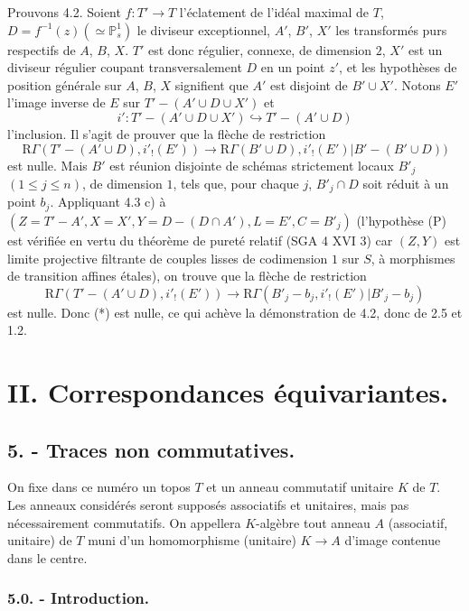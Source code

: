 Prouvons 4.2. Soient $f:T'\to T$ l'éclatement de l'idéal
maximal de $T$, $D=f^{-1}(z)(\simeq\mathbb{P}^1_s)$ le diviseur exceptionnel, $A'$, $B'$, $X'$ les transformés purs respectifs de $A$, $B$, $X$. $T'$ est donc régulier, connexe, de dimension $2$, $X'$ est un diviseur régulier coupant transversalement $D$ en un point $z'$, et les hypothèses de position générale sur $A$, $B$, $X$ signifient que $A'$ est disjoint de 
$B'\cup X'$. Notons $E'$ l'image inverse de $E$ sur $T'-(A'\cup D\cup X')$ et
\[
i':T'-(A'\cup D\cup X')\hookrightarrow T'-(A'\cup D)
\]
l'inclusion. Il s'agit de prouver que la flèche de restriction
\begin{equation}
\mathrm{R}\Gamma(T'-(A'\cup D),i'_!(E'))
\longrightarrow
\mathrm{R}\Gamma(B'\cup D),i'_!(E')|B'-(B'\cup D))
\tag{*}
\end{equation}
est nulle. Mais $B'$ est réunion disjointe de schémas strictement locaux $B'_j$ $(1\le j\le n)$, de dimension $1$, tels que, pour chaque $j$, $B'_j\cap D$ soit réduit à un point $b_j$. Appliquant 4.3 c) à $(Z=T'-A', X=X', Y=D-(D\cap A'), L=E', C=B'_j)$ (l'hypothèse (P) est vérifiée en vertu du théorème de pureté relatif (SGA 4 XVI 3) car $(Z,Y)$ est limite projective filtrante de couples lisses de codimension $1$ sur $S$, à morphismes de transition affines étales), on trouve que la flèche de restriction
\[
\mathrm{R}\Gamma(T'-(A'\cup D),i'_!(E'))
\longrightarrow
\mathrm{R}\Gamma(B'_j-b_j,i'_!(E')|B'_j-b_j)
\]
est nulle. Donc (*) est nulle, ce qui achève la démonstration de 4.2, donc de 2.5 et 1.2.

\section*{II. Correspondances équivariantes.}

\subsection*{5. - Traces non commutatives.}

On fixe dans ce numéro un topos $T$ et un anneau commutatif unitaire $K$ de $T$. Les anneaux considérés seront supposés associatifs et unitaires, mais pas nécessairement commutatifs. On appellera $K$-algèbre tout anneau $A$ (associatif, unitaire) de $T$ muni d'un homomorphisme (unitaire) $K\to A$ d'image contenue dans le centre.

\subsubsection*{5.0. - Introduction.}

